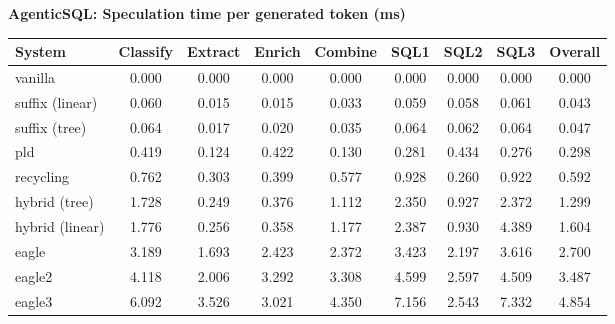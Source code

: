 \textbf{AgenticSQL: Speculation time per generated token (ms)}
\begin{table}[H]
\begin{adjustbox}{width=\linewidth}
\centering
\begin{tabular}{lcccccccc}
\toprule
\textbf{System} & Classify & Extract & Enrich & Combine & SQL1 & SQL2 & SQL3 & \textbf{Overall} \\
\midrule
vanilla & 0.000 & 0.000 & 0.000 & 0.000 & 0.000 & 0.000 & 0.000 & 0.000 \\
suffix (linear) & 0.060 & 0.015 & 0.015 & 0.033 & 0.059 & 0.058 & 0.061 & 0.043 \\
suffix (tree) & 0.064 & 0.017 & 0.020 & 0.035 & 0.064 & 0.062 & 0.064 & 0.047 \\
pld & 0.419 & 0.124 & 0.422 & 0.130 & 0.281 & 0.434 & 0.276 & 0.298 \\
recycling & 0.762 & 0.303 & 0.399 & 0.577 & 0.928 & 0.260 & 0.922 & 0.592 \\
hybrid (tree) & 1.728 & 0.249 & 0.376 & 1.112 & 2.350 & 0.927 & 2.372 & 1.299 \\
hybrid (linear) & 1.776 & 0.256 & 0.358 & 1.177 & 2.387 & 0.930 & 4.389 & 1.604 \\
eagle & 3.189 & 1.693 & 2.423 & 2.372 & 3.423 & 2.197 & 3.616 & 2.700 \\
eagle2 & 4.118 & 2.006 & 3.292 & 3.308 & 4.599 & 2.597 & 4.509 & 3.487 \\
eagle3 & 6.092 & 3.526 & 3.021 & 4.350 & 7.156 & 2.543 & 7.332 & 4.854 \\
\bottomrule
\end{tabular}
\end{adjustbox}
\end{table}

